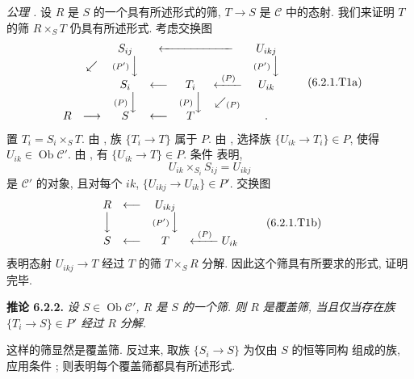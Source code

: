 \smallskip
\noindent\textit{公理 .}
设 \(R\) 是 \(S\) 的一个具有所述形式的筛,
\(T\to S\) 是 \(\mathscr C\) 中的态射.
我们来证明 \(T\) 的筛 \(R\times_ST\) 仍具有所述形式. 考虑交换图
\[
\begin{array}{ccccccc}
  & & S_{ij} & \multicolumn{3}{c}{\xleftarrow{\hspace{6em}}} & U_{ikj}\\
  & \swarrow & \scriptstyle(P')\,\Big\downarrow & & & &
    \scriptstyle(P')\,\Big\downarrow\\[-0.25em]
  & & S_i & \longleftarrow & T_i & \xleftarrow{\ (P)\ } & U_{ik}\\
  & & \scriptstyle(P)\,\Big\downarrow & &
    \scriptstyle(P)\,\Big\downarrow & \swarrow_{\scriptstyle(P)} &\\[-0.25em]
  R & \longrightarrow & S & \longleftarrow & T & & .
\end{array}
\tag{6.2.1.T1a}\label{sga3:iv:proposition:6:2:1:eq:6:2:1:t1a:01}
\]
置 \(T_i=S_i\times_ST\). 由 ,
族 \(\{T_i\to T\}\) 属于 \(P\).
由 ,
选择族 \(\{U_{ik}\to T_i\}\in P\), 使得 \(U_{ik}\in\operatorname{Ob}\mathscr C'\).
由 ,
有 \(\{U_{ik}\to T\}\in P\).
条件  表明,
\[
  U_{ik}\times_{S_i}S_{ij}=U_{ikj}
\]
是 \(\mathscr C'\) 的对象, 且对每个 \(ik\),
\(\{U_{ikj}\to U_{ik}\}\in P'\). 交换图
\[
\begin{array}{ccccc}
  R & \longleftarrow & U_{ikj}\\
  \Big\downarrow & & \scriptstyle(P')\,\Big\downarrow\\[-0.25em]
  S & \longleftarrow & T & \xleftarrow{\ (P)\ } U_{ik}
\end{array}
\tag{6.2.1.T1b}\label{sga3:iv:proposition:6:2:1:eq:6:2:1:t1b:01}
\]
表明态射 \(U_{ikj}\to T\) 经过 \(T\) 的筛 \(T\times_SR\) 分解.
因此这个筛具有所要求的形式, 证明完毕.

\medskip
\noindent{}\textbf{推论 6.2.2.}
\textit{设 \(S\in\operatorname{Ob}\mathscr C'\), \(R\) 是 \(S\) 的一个筛.
则 \(R\) 是覆盖筛, 当且仅当存在族 \(\{T_i\to S\}\in P'\) 经过 \(R\) 分解.}

这样的筛显然是覆盖筛. 反过来, 取族 \(\{S_i\to S\}\) 为仅由 \(S\) 的恒等同构
组成的族, 应用条件 ;
则表明每个覆盖筛都具有所述形式.

